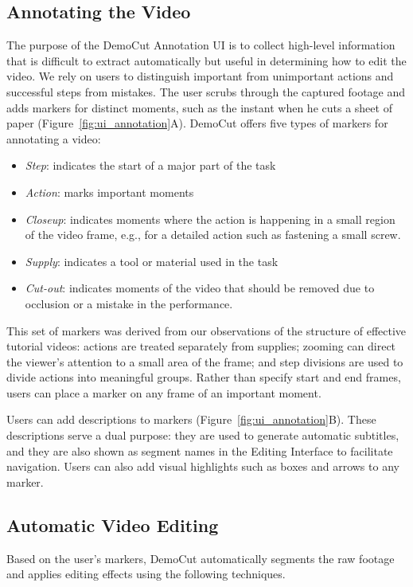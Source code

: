 \subsection{Annotating the Video}
The purpose of the DemoCut Annotation UI is to collect high-level information that is difficult to extract automatically but useful in determining how to edit the video.
We rely on users to distinguish important from unimportant actions and successful steps from mistakes.
The user scrubs through the captured footage and adds markers for distinct moments, such as the instant when he cuts a sheet of paper (Figure~\ref{fig:ui_annotation}A). DemoCut offers five types of markers for annotating a video:
\begin{itemize}
  \item \emph{Step}: indicates the start of a major part of the task
  \item \emph{Action}: marks important moments
  \item \emph{Closeup}: indicates moments where the action is happening in a small region of the video frame, e.g., for a detailed action such as fastening a small screw. %
  \item \emph{Supply}: indicates a tool or material used in the task
  \item \emph{Cut-out}: indicates moments of the video that should be removed due to occlusion or a mistake in the performance.
\end{itemize}
This set of markers was derived from our observations of the structure of effective tutorial videos: actions are treated separately from supplies; zooming can direct the viewer's attention to a small area of the frame; and step divisions are used to divide actions into meaningful groups. Rather than specify start and end frames, users can place a marker on any frame of an important moment.

Users can add descriptions to markers (Figure~\ref{fig:ui_annotation}B). These descriptions serve a dual purpose: they are used to generate automatic subtitles, and they are also shown as segment names in the Editing Interface to facilitate navigation. Users can also add visual highlights such as boxes and arrows to any marker.

\subsection{Automatic Video Editing}
Based on the user's markers, DemoCut automatically segments the raw footage and applies editing effects using the following techniques.

